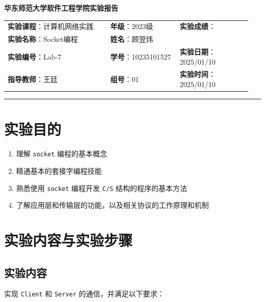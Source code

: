 \documentclass{article}
\begin{document}
	\begin{center}
		{\Large{\textbf{\heiti 华东师范大学软件工程学院实验报告}}}
		\begin{table}[htb]
			\flushleft
			\begin{tabular}{p{0.4\linewidth}p{0.27\linewidth}p{0.28\linewidth}}\\
				\textbf{实验课程}：计算机网络实践  & \textbf{年级}：2023级       & \textbf{实验成绩}：  \\
				\textbf{实验名称}：Socket编程 & \textbf{姓名}：顾翌炜         &                 \\
				\textbf{实验编号}：Lab-7     & \textbf{学号}：10235101527 & \textbf{实验日期}：2025/01/10  \\
				\textbf{指导教师}：王廷     & \textbf{组号}：01            & \textbf{实验时间}：2025/01/10  \\ 
			\end{tabular}
		\end{table}
	\end{center}
	\rule{\textwidth}{2pt}
	
	\section{实验目的}
	
	\begin{enumerate}[noitemsep, label={{\arabic*})}]
		\item 理解 \texttt{socket} 编程的基本概念
		\item 精通基本的套接字编程技能
		\item 熟悉使用 \texttt{socket} 编程开发 \texttt{C/S} 结构的程序的基本方法
		\item 了解应用层和传输层的功能，以及相关协议的工作原理和机制
	\end{enumerate}
	
	
	\section{实验内容与实验步骤}
	
	\subsection{实验内容}
	
	实现 \texttt{Client} 和 \texttt{Server} 的通信，并满足以下要求：
	
\end{document}
